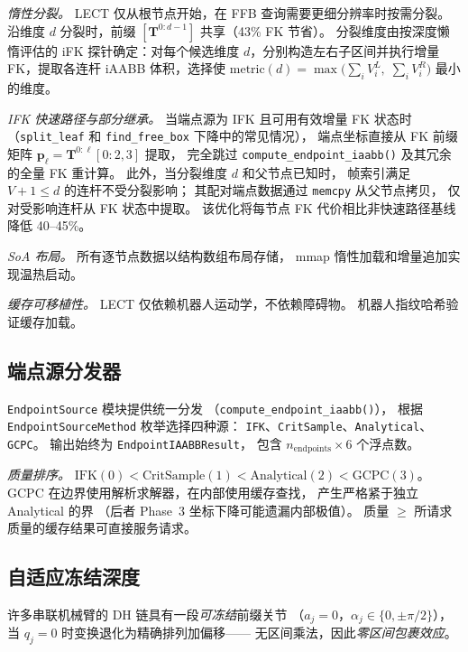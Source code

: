 \documentclass[journal]{IEEEtran}
\newcommand{\bT}{\mathbf{T}}
\begin{document}
\emph{惰性分裂。}
LECT 仅从根节点开始，在 FFB 查询需要更细分辨率时按需分裂。
沿维度 $d$ 分裂时，前缀 $[\bT^{0:d-1}]$ 共享（43\% FK 节省）。
分裂维度由按深度懒惰评估的 iFK 探针确定：对每个候选维度
$d$，分别构造左右子区间并执行增量 FK，提取各连杆 iAABB 体积，选择使
$\text{metric}(d) = \max\bigl(\sum_i V_i^L,\; \sum_i V_i^R\bigr)$ 最小的维度。

\emph{IFK 快速路径与部分继承。}
当端点源为 IFK 且可用有效增量 FK 状态时
（\texttt{split\_leaf} 和 \texttt{find\_free\_box} 下降中的常见情况），
端点坐标直接从 FK 前缀矩阵
$\bm{p}_\ell = \bT^{0:\ell}[0{:}2,3]$ 提取，
完全跳过 \texttt{compute\_endpoint\_iaabb()} 及其冗余的全量 FK 重计算。
此外，当分裂维度 $d$ 和父节点已知时，
帧索引满足 $V+1 \leq d$ 的连杆不受分裂影响；
其配对端点数据通过 \texttt{memcpy} 从父节点拷贝，
仅对受影响连杆从 FK 状态中提取。
该优化将每节点 FK 代价相比非快速路径基线降低 40--45\%。

\emph{SoA 布局。}
所有逐节点数据以结构数组布局存储，
mmap 惰性加载和增量追加实现温热启动。

\emph{缓存可移植性。}
LECT 仅依赖机器人运动学，不依赖障碍物。
机器人指纹哈希验证缓存加载。

\subsection{端点源分发器}\label{sec:endpoint_dispatch}

\texttt{EndpointSource} 模块提供统一分发
（\texttt{compute\_endpoint\_iaabb()}），
根据 \texttt{EndpointSourceMethod} 枚举选择四种源：
\texttt{IFK}、\texttt{CritSample}、\texttt{Analytical}、\texttt{GCPC}。
输出始终为 \texttt{EndpointIAABBResult}，
包含 $n_\text{endpoints} \times 6$ 个浮点数。

\emph{质量排序。}
$\mathrm{IFK}(0) < \mathrm{CritSample}(1) <
\mathrm{Analytical}(2) < \mathrm{GCPC}(3)$。
GCPC 在边界使用解析求解器，在内部使用缓存查找，
产生严格紧于独立 Analytical 的界
（后者 Phase~3 坐标下降可能遗漏内部极值）。
质量 $\geq$ 所请求质量的缓存结果可直接服务请求。

\subsection{自适应冻结深度}\label{sec:freeze}

许多串联机械臂的 DH 链具有一段\emph{可冻结}前缀关节
（$a_j{=}0$，$\alpha_j \in \{0, \pm\pi/2\}$），
当 $q_j{=}0$ 时变换退化为精确排列加偏移——
无区间乘法，因此\emph{零区间包裹效应}。
\end{document}

